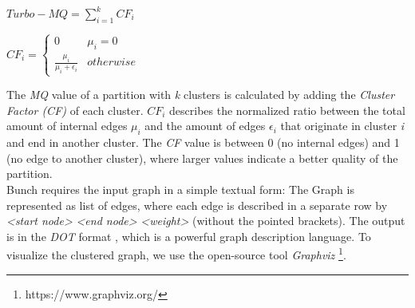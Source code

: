 \vspace{1cm}
\noindent
\begin{minipage}{.25\linewidth}
	
	\flushleft
	\begin{math}
	  Turbo-MQ = \sum_{i=1}^{k} CF_{i} 
	\end{math}
	

\end{minipage}%
\begin{minipage}{.5\linewidth}
	\flushleft
	\begin{math}
      CF_{i} = \begin{cases}
       0 & \mu_{i} = 0 \\
        \frac{\mu_{i}}{\mu_{i} + \epsilon_{i}}  & otherwise
      \end{cases}
  \end{math}


\end{minipage}
\vspace{1cm}


The \textit{MQ} value of a partition with \textit{k} clusters is calculated by adding the \textit{Cluster Factor (CF)} of each cluster. $CF_{i}$ describes the normalized ratio between the total amount of internal edges $\mu_{i}$ and the amount of edges $\epsilon_{i}$ that originate in cluster \textit{i} and end in another cluster. The \textit{CF} value is between 0 (no internal edges) and 1 (no edge to another cluster), where larger values indicate a better quality of the partition. \\
Bunch requires the input graph in a simple textual form: The Graph is represented as list of edges, where each edge is described in a separate row by \textit{<start node>} \textit{<end node>} \textit{<weight>} (without the pointed brackets). The output is in the \textit{DOT} format \cite{DOT}, which is a powerful graph description language. To visualize the clustered graph, we use the open-source tool \textit{Graphviz} \footnote{https://www.graphviz.org/}.




